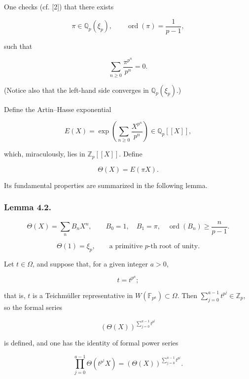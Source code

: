 One checks (cf. [2]) that there exists

\begin{equation}\tag{4.1.4}
\pi\in\mathbb Q_p(\xi_p),\qquad
\operatorname{ord}(\pi)=\frac1{p-1},
\end{equation}

such that

\begin{equation}\tag{4.1.5}
\sum_{n\geq0}\frac{\pi^{p^n}}{p^n}=0.
\end{equation}

(Notice also that the left-hand side converges in $\mathbb Q_p(\xi_p)$.)

Define the Artin--Hasse exponential

\begin{equation}\tag{4.1.6}
E(X)=\exp\!\left(\sum_{n\geq0}\frac{X^{p^n}}{p^n}\right)
\in\mathbb Q_p[[X]],
\end{equation}

which, miraculously, lies in $\mathbb Z_p[[X]]$. Define

\begin{equation}\tag{4.1.7}
\Theta(X)=E(\pi X).
\end{equation}

Its fundamental properties are summarized in the following lemma.

\subsubsection*{Lemma 4.2.}

\begin{equation}\tag{4.2.1}
\Theta(X)=\sum_n B_n X^n,\qquad B_0=1,\quad B_1=\pi,\quad
\operatorname{ord}(B_n)\geq\frac n{p-1}.
\end{equation}

\begin{equation}\tag{4.2.2}
\Theta(1)=\xi_p,\qquad\text{a primitive $p$-th root of unity.}
\end{equation}

Let $t\in\Omega$, and suppose that, for a given integer $a>0$,

\begin{equation}\tag{4.2.3}
t=t^{p^a};
\end{equation}

that is, $t$ is a Teichmüller representative in
$W(\mathbb F_{p^a})\subset\Omega$. Then
$\sum_{j=0}^{a-1}t^{p^j}\in\mathbb Z_p$, so the formal series

\[
(\Theta(X))^{\sum_{j=0}^{a-1}t^{p^j}}
\]

is defined, and one has the identity of formal power series

\begin{equation}\tag{4.2.3.1}
\prod_{j=0}^{a-1}\Theta(t^{p^j}X)
=(\Theta(X))^{\sum_{j=0}^{a-1}t^{p^j}}.
\end{equation}
